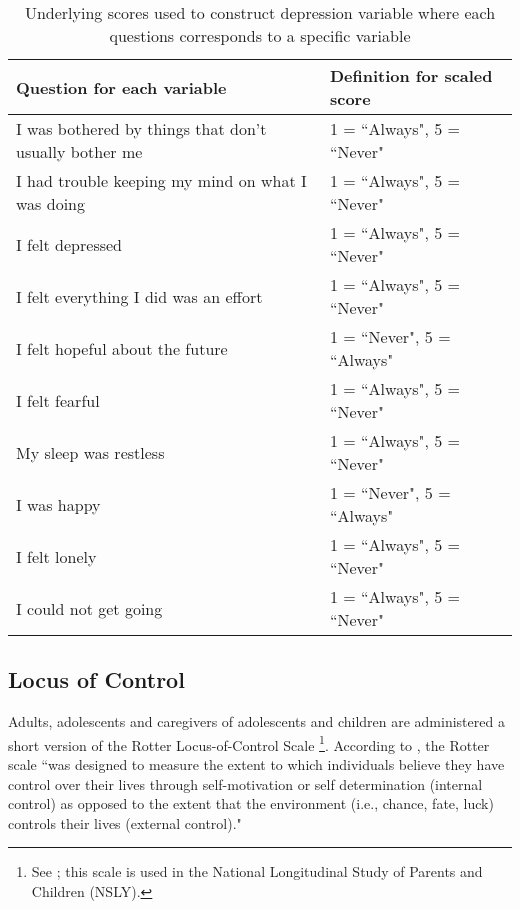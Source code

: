 \begin{table}[H]
\begin{center}
\footnotesize{
\caption{Underlying scores used to construct depression variable where each questions corresponds to a specific variable}
	\begin{tabular}{L{8.5cm} l}
	\hline
	\textbf{Question for each variable}	 					& \textbf{Definition for scaled score} \\
	\hline
	I was bothered by things that don’t usually bother me	& 1 = ``Always", 5 = ``Never"  \\	
	I had trouble keeping my mind on what I was doing	& 1 = ``Always", 5 = ``Never"  	\\
	I felt depressed											& 1 = ``Always", 5 = ``Never"	 \\
	I felt everything I did was an effort						& 1 = ``Always", 5 = ``Never"	 \\
	I felt hopeful about the future							& 1 = ``Never",  5 = ``Always"	 \\
	I felt fearful 												& 1 = ``Always", 5 = ``Never"	\\ 
	My sleep was restless										& 1 = ``Always", 5 = ``Never" \\
	I was happy												& 1 = ``Never", 5 = ``Always" \\
	I felt lonely												& 1 = ``Always", 5 = ``Never"  \\
	I could not get going 										& 1 = ``Always",  5 = ``Never" \\
	
	\hline
	
	\end{tabular}
}

\end{center}
\end{table}
\clearpage

\subsection{Locus of Control}
Adults, adolescents and caregivers of adolescents and children are administered a short version of the Rotter Locus-of-Control Scale \footnote{See \cite{Rotter_1966_PMGaA}; this scale is used in the National Longitudinal Study of Parents and Children (NSLY).}. According to  \citet{Miller_2004_BOOKNLSY79}, the Rotter scale ``was designed to measure the extent to which individuals believe they have control over their lives through self-motivation or self determination (internal control) as opposed to the extent that the environment (i.e., chance, fate, luck) controls their lives (external control)."

